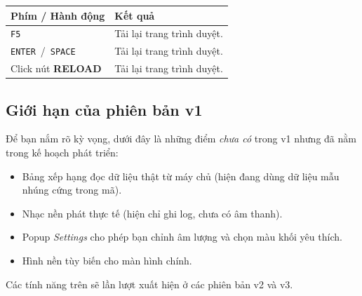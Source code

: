 \documentclass[12pt,a4paper]{article}
\begin{document}
\begin{tabularx}{\linewidth}{|l|X|}
    \hline
    \textbf{Phím / Hành động} & \textbf{Kết quả} \\
    \hline
    \texttt{F5}                                   & Tải lại trang trình duyệt. \\
    \hline
    \texttt{ENTER} \,/\, \texttt{SPACE}           & Tải lại trang trình duyệt. \\
    \hline
    Click nút \textbf{RELOAD}                     & Tải lại trang trình duyệt. \\
    \hline
\end{tabularx}

\subsection{Giới hạn của phiên bản v1}
Để bạn nắm rõ kỳ vọng, dưới đây là những điểm \emph{chưa có} trong v1 nhưng đã nằm trong kế hoạch phát triển:
\begin{itemize}
    \item Bảng xếp hạng đọc dữ liệu thật từ máy chủ (hiện đang dùng dữ liệu mẫu nhúng cứng trong mã).
    \item Nhạc nền phát thực tế (hiện chỉ ghi log, chưa có âm thanh).
    \item Popup \textit{Settings} cho phép bạn chỉnh âm lượng và chọn màu khối yêu thích.
    \item Hình nền tùy biến cho màn hình chính.
\end{itemize}
Các tính năng trên sẽ lần lượt xuất hiện ở các phiên bản v2 và v3.

\label{LastPageGameConsoleGuide}
\end{document}

